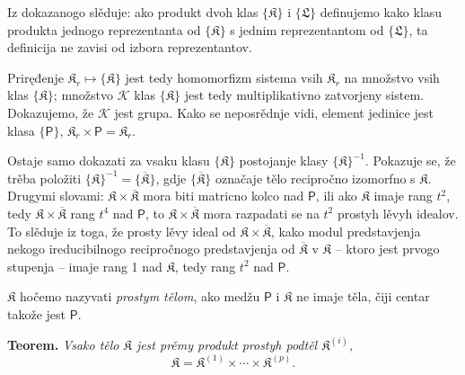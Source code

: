 \documentclass[11pt]{article}
\begin{document}
Iz dokazanogo slěduje: ako produkt dvoh klas \(\{\mathfrak K\}\) i \(\{\mathfrak L\}\) definujemo kako klasu produkta jednogo reprezentanta od \(\{\mathfrak K\}\) s jednim reprezentantom od \(\{\mathfrak L\}\), ta definicija ne zavisi od izbora reprezentantov.

Priręđenje \(\mathfrak K_r\mapsto\{\mathfrak K\}\) jest tedy homomorfizm sistema vsih \(\mathfrak K_r\) na množstvo vsih klas \(\{\mathfrak K\}\); množstvo \(\mathscr K\) klas \(\{\mathfrak K\}\) jest tedy multiplikativno zatvorjeny sistem. Dokazujemo, že \(\mathscr K\) jest grupa. Kako se neposrědnje vidi, element jedinice jest klasa \(\{\mathsf P\}\), \(\mathfrak K_r\times\mathsf P=\mathfrak K_r\).

Ostaje samo dokazati za vsaku klasu \(\{\mathfrak K\}\) postojanje klasy \(\{\mathfrak K\}^{-1}\). Pokazuje se, že trěba položiti \(\{\mathfrak K\}^{-1}=\{\overline{\mathfrak K}\}\), gdje \(\{\overline{\mathfrak K}\}\) označaje tělo recipročno izomorfno s \(\mathfrak K\). Drugymi slovami: \(\mathfrak K\times\overline{\mathfrak K}\) mora biti matricno kolco nad \(\mathsf P\), ili ako \(\mathfrak K\) imaje rang \(t^2\), tedy \(\mathfrak K\times\overline{\mathfrak K}\) rang \(t^4\) nad \(\mathsf P\), to \(\mathfrak K\times\overline{\mathfrak K}\) mora razpadati se na \(t^2\) prostyh lěvyh idealov. To slěduje iz toga, že prosty lěvy ideal od \(\mathfrak K\times\overline{\mathfrak K}\), kako modul predstavjenja nekogo ireducibilnogo recipročnogo predstavjenja od \(\overline{\mathfrak K}\) v \(\mathfrak K\) -- ktoro jest prvogo stupenja -- imaje rang 1 nad \(\mathfrak K\), tedy rang \(t^2\) nad \(\mathsf P\).

\(\mathfrak K\) hočemo nazyvati \emph{prostym tělom}, ako medžu \(\mathsf P\) i \(\mathfrak K\) ne imaje těla, čiji centar takože jest \(\mathsf P\).

\textbf{Teorem.} \emph{Vsako tělo \(\mathfrak K\) jest prěmy produkt prostyh podtěl \(\mathfrak K^{(i)}\),}
\[
\mathfrak K=\mathfrak K^{(1)}\times\cdots\times\mathfrak K^{(p)}.
\]
\end{document}
